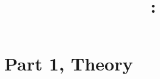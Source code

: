 \documentclass{article}
\title{
\vspace{2in}
\textmd{\textbf{\hmwkClass:\ \hmwkTitle}}\\
\normalsize\vspace{0.1in}\normalsize{\hmwkDueDate}
\vspace{0.1in}\large{\text{Parallel Computing}}
\vspace{3in}
}
\author{\textbf{\hmwkAuthorName}}
\date{} %
\begin{document}
\maketitle

\setcounter{tocdepth}{1} %



\clearpage

\section{Part 1, Theory}
\end{document}
